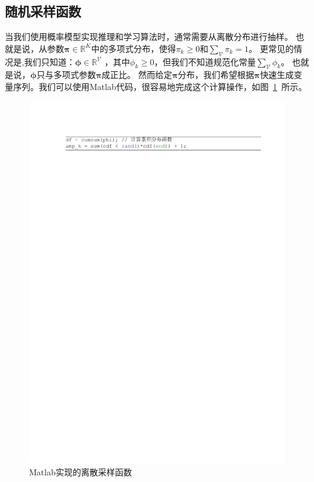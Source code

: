 \subsection{随机采样函数}
当我们使用概率模型实现推理和学习算法时，通常需要从离散分布进行抽样。 也就是说，从参数$\boldsymbol {\pi} \in \mathbb{R} ^ K$中的多项式分布，使得$\pi_k \geq 0$和$\sum_{\mathcal{V}} \pi_{k} = 1$。 更常见的情况是,我们只知道：$\boldsymbol {\phi}\in \mathbb{R}^{\mathcal{V}}$ ，其中$\phi_k \geq 0$，但我们不知道规范化常量$\sum_{\mathcal{V}} \phi_{k}$。 也就是说，$\boldsymbol{\phi}$只与多项式参数$\boldsymbol {\pi}$成正比。
然而给定$\boldsymbol {\pi}$分布，我们希望根据$\boldsymbol{\pi}$快速生成变量序列。我们可以使用Matlab代码，很容易地完成这个计算操作，如图~\ref{fig:sample}~所示。
\begin{figure}[!t]
  \centering
\includegraphics[width=1\linewidth]{./figures/cdf.pdf}
\caption{Matlab实现的离散采样函数}\label{fig:sample}
\end{figure}

